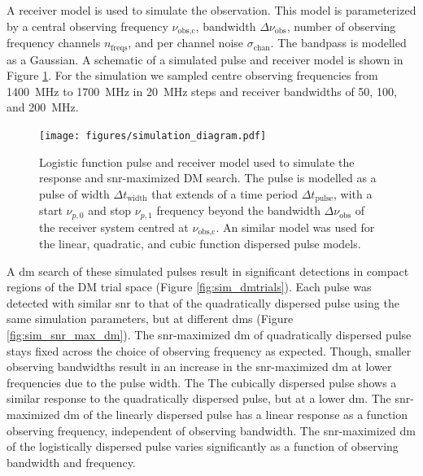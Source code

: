 \documentclass[a4paper,fleqn,usenatbib]{mnras}
\begin{document}
A receiver model is used to simulate the observation. This model is
parameterized by a central observing frequency $\nu_{\textrm{obs,c}}$, bandwidth
$\Delta \nu_{\textrm{obs}}$, number of observing frequency channels
$n_{\textrm{freqs}}$, and per channel noise $\sigma_{\textrm{chan}}$. The
bandpass is modelled as a Gaussian. A schematic of a simulated pulse and
receiver model is shown in Figure \ref{fig:simulation_diagram}. For the
simulation we sampled centre observing frequencies from 1400~MHz to 1700~MHz in
20~MHz steps and receiver bandwidths of 50, 100, and 200~MHz.

\begin{figure}
    \texttt{[image: figures/simulation\_diagram.pdf]}
    \caption{Logistic function pulse and receiver model used to simulate the
    response and \gls{snr}-maximized DM search. The pulse is modelled as a pulse
    of width $\Delta t_{\textrm{width}}$ that extends of a time period $\Delta
    t_{\textrm{pulse}}$, with a start $\nu_{p,0}$ and stop $\nu_{p,1}$ frequency
    beyond the bandwidth $\Delta \nu_{\textrm{obs}}$ of the receiver system
    centred at $\nu_{\textrm{obs,c}}$. An similar model was used for the linear,
    quadratic, and cubic function dispersed pulse models.
    }
    \label{fig:simulation_diagram}
\end{figure}

A \gls{dm} search of these simulated pulses result in significant detections in
compact regions of the DM trial space (Figure \ref{fig:sim_dmtrials}). Each
pulse was detected with similar \gls{snr} to that of the quadratically dispersed
pulse using the same simulation parameters, but at different \glspl{dm} (Figure
\ref{fig:sim_snr_max_dm}). The \gls{snr}-maximized \gls{dm} of quadratically
dispersed pulse stays fixed across the choice of observing frequency as
expected. Though, smaller observing bandwidths result in an increase in the
\gls{snr}-maximized \gls{dm} at lower frequencies due to the pulse width. The
The cubically dispersed pulse shows a similar response to the quadratically
dispersed pulse, but at a lower \gls{dm}. The \gls{snr}-maximized \gls{dm} of
the linearly dispersed pulse has a linear response as a function observing
frequency, independent of observing bandwidth. The \gls{snr}-maximized \gls{dm}
of the logistically dispersed pulse varies significantly as a function of
observing bandwidth and frequency.
\end{document}
